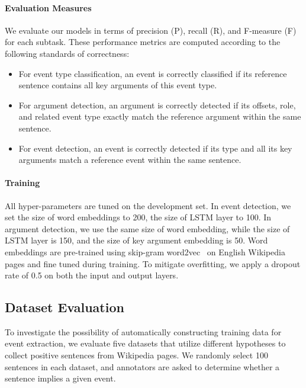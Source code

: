 \paragraph{Evaluation Measures} We evaluate our models in terms of precision (P), recall (R), and F-measure (F) for each subtask. These performance metrics are computed according to the following standards of correctness: 
\begin{itemize}
	\item For event type classification, an event is correctly classified if its reference sentence contains all key arguments of this event type. 
	\item For argument detection, an argument is correctly detected if its offsets, role, and related event type exactly match the reference argument within the same sentence. 
	\item For event detection, an event is correctly detected if its type and all its key arguments match a reference event within the same sentence.
\end{itemize}

\paragraph{Training} All hyper-parameters are tuned on the development set. In event detection, we set the size of word embeddings to 200, the size of LSTM layer to 100. In argument detection, we use the same size of word embedding, while the size of LSTM layer is 150, and the size of key argument embedding is 50. Word embeddings are pre-trained using skip-gram word2vec~\cite{mikolov2013distributed} on English Wikipedia pages and fine tuned during training. To mitigate overfitting, we apply a dropout rate of 0.5 on both the input and output layers.

\subsection{Dataset Evaluation}\label{sec:evalhypo}
To investigate the possibility of automatically constructing training data for event extraction, we evaluate five datasets that utilize different hypotheses to collect positive sentences from Wikipedia pages. We randomly select 100 sentences in each dataset, and annotators are asked to determine whether a sentence implies a given event.

